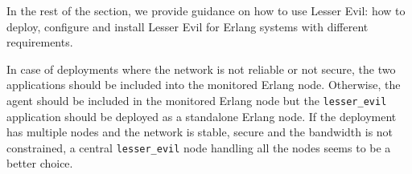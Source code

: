 \documentclass{llncs}
\begin{document}



In the rest of the section, we provide guidance on how to use Lesser Evil: how to deploy, configure and install Lesser Evil for Erlang systems with different requirements.
 
In case of deployments where the network is not reliable or not secure, the two applications should be included into the monitored Erlang node. Otherwise, the agent should be included in the monitored Erlang node but the \verb+lesser_evil+ application should be deployed as a standalone Erlang node. If the deployment has multiple nodes and the network is stable, secure and the bandwidth is not constrained, a central \verb+lesser_evil+ node handling all the nodes seems to be a better choice.
\end{document}
